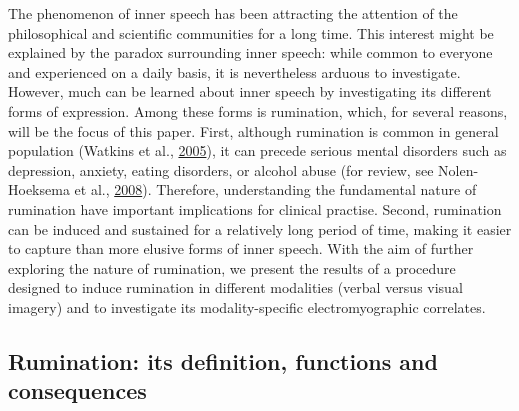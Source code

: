 \documentclass[a4paper,12pt,twoside,openright,oldfontcommands]{memoir}
\begin{document}
The phenomenon of inner speech has been attracting the attention of the philosophical and scientific communities for a long time. This interest might be explained by the paradox surrounding inner speech: while common to everyone and experienced on a daily basis, it is nevertheless arduous to investigate. However, much can be learned about inner speech by investigating its different forms of expression. Among these forms is rumination, which, for several reasons, will be the focus of this paper. First, although rumination is common in general population (Watkins et al., \protect\hyperlink{ref-watkins_comparisons_2005}{2005}), it can precede serious mental disorders such as depression, anxiety, eating disorders, or alcohol abuse (for review, see Nolen-Hoeksema et al., \protect\hyperlink{ref-Nolen-Hoeksema2008}{2008}). Therefore, understanding the fundamental nature of rumination have important implications for clinical practise. Second, rumination can be induced and sustained for a relatively long period of time, making it easier to capture than more elusive forms of inner speech. With the aim of further exploring the nature of rumination, we present the results of a procedure designed to induce rumination in different modalities (verbal versus visual imagery) and to investigate its modality-specific electromyographic correlates.

\hypertarget{rumination-its-definition-functions-and-consequences}{%
\subsection{Rumination: its definition, functions and consequences}\label{rumination-its-definition-functions-and-consequences}}
\end{document}
